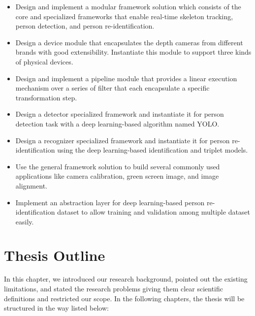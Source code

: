 \begin{itemize}
	\item Design and implement a modular framework solution which consists of
	the core and specialized frameworks that enable real-time skeleton 
	tracking, person detection, and person re-identification.

    \item Design a device module that encapsulates the depth cameras from
    different brands with good extensibility. Instantiate this module to
    support three kinds of physical devices.
    
    \item Design and implement a pipeline module that provides a linear
    execution mechanism over a series of filter that each encapsulate a 
    specific transformation step.

    \item Design a detector specialized framework and instantiate it for
    person detection task with a deep learning-based algorithm named YOLO.

    \item Design a recognizer specialized framework and instantiate it for
    person re-identification using the deep learning-based identification and
    triplet models.

    \item Use the general framework solution to build several commonly used
    applications like camera calibration, green screen image, and image
    alignment.

    \item Implement an abstraction layer for deep learning-based person
    re-identification dataset to allow training and validation among multiple
    dataset easily.
\end{itemize}


\section{Thesis Outline}
\label{sec:intro-outline}

In this chapter, we introduced our research background, pointed out the
existing limitations, and stated the research problems giving them clear
scientific definitions and restricted our scope.
In the following chapters, the thesis will be structured in the way listed
below:


